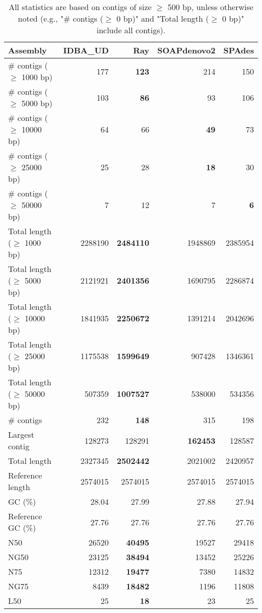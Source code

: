 \documentclass[12pt,a4paper]{article}
\begin{document}
\begin{table}[ht]
\begin{center}
\caption{All statistics are based on contigs of size $\geq$ 500 bp, unless otherwise noted (e.g., "\# contigs ($\geq$ 0 bp)" and "Total length ($\geq$ 0 bp)" include all contigs).}
\begin{tabular}{|l*{4}{|r}|}
\hline
Assembly & IDBA\_UD & Ray & SOAPdenovo2 & SPAdes \\ \hline
\# contigs ($\geq$ 1000 bp) & 177 & {\bf 123} & 214 & 150 \\ \hline
\# contigs ($\geq$ 5000 bp) & 103 & {\bf 86} & 93 & 106 \\ \hline
\# contigs ($\geq$ 10000 bp) & 64 & 66 & {\bf 49} & 73 \\ \hline
\# contigs ($\geq$ 25000 bp) & 25 & 28 & {\bf 18} & 30 \\ \hline
\# contigs ($\geq$ 50000 bp) & 7 & 12 & 7 & {\bf 6} \\ \hline
Total length ($\geq$ 1000 bp) & 2288190 & {\bf 2484110} & 1948869 & 2385954 \\ \hline
Total length ($\geq$ 5000 bp) & 2121921 & {\bf 2401356} & 1690795 & 2286874 \\ \hline
Total length ($\geq$ 10000 bp) & 1841935 & {\bf 2250672} & 1391214 & 2042696 \\ \hline
Total length ($\geq$ 25000 bp) & 1175538 & {\bf 1599649} & 907428 & 1346361 \\ \hline
Total length ($\geq$ 50000 bp) & 507359 & {\bf 1007527} & 538000 & 534356 \\ \hline
\# contigs & 232 & {\bf 148} & 315 & 198 \\ \hline
Largest contig & 128273 & 128291 & {\bf 162453} & 128587 \\ \hline
Total length & 2327345 & {\bf 2502442} & 2021002 & 2420957 \\ \hline
Reference length & 2574015 & 2574015 & 2574015 & 2574015 \\ \hline
GC (\%) & 28.04 & 27.99 & 27.88 & 27.94 \\ \hline
Reference GC (\%) & 27.76 & 27.76 & 27.76 & 27.76 \\ \hline
N50 & 26520 & {\bf 40495} & 19527 & 29418 \\ \hline
NG50 & 23125 & {\bf 38494} & 13452 & 25226 \\ \hline
N75 & 12312 & {\bf 19477} & 7380 & 14832 \\ \hline
NG75 & 8439 & {\bf 18482} & 1196 & 11808 \\ \hline
L50 & 25 & {\bf 18} & 23 & 25 \\ \hline

\end{tabular}
\end{center}
\end{table}
\end{document}
